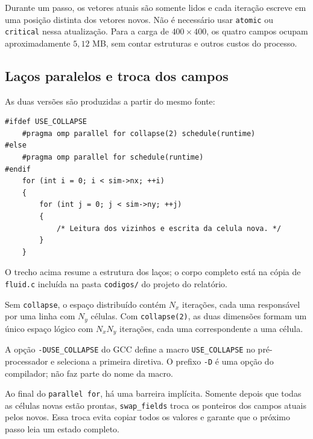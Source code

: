 \documentclass[12pt,a4paper]{article}
\begin{document}
Durante um passo, os vetores atuais são somente lidos e cada iteração escreve em uma posição distinta dos vetores novos. Não é necessário usar \texttt{atomic} ou \texttt{critical} nessa atualização. Para a carga de $400\times400$, os quatro campos ocupam aproximadamente $5{,}12$ MB, sem contar estruturas e outros custos do processo.

\subsection{Laços paralelos e troca dos campos}
As duas versões são produzidas a partir do mesmo fonte:
\begin{lstlisting}[style=CStyle,caption={Seleção da diretiva OpenMP durante a compilação.}]
#ifdef USE_COLLAPSE
    #pragma omp parallel for collapse(2) schedule(runtime)
#else
    #pragma omp parallel for schedule(runtime)
#endif
    for (int i = 0; i < sim->nx; ++i)
    {
        for (int j = 0; j < sim->ny; ++j)
        {
            /* Leitura dos vizinhos e escrita da celula nova. */
        }
    }
\end{lstlisting}
O trecho acima resume a estrutura dos laços; o corpo completo está na cópia de \texttt{fluid.c} incluída na pasta \texttt{codigos/} do projeto do relatório.

Sem \texttt{collapse}, o espaço distribuído contém $N_x$ iterações, cada uma responsável por uma linha com $N_y$ células. Com \texttt{collapse(2)}, as duas dimensões formam um único espaço lógico com $N_xN_y$ iterações, cada uma correspondente a uma célula.

A opção \texttt{-DUSE\_COLLAPSE} do GCC define a macro \texttt{USE\_COLLAPSE} no pré-processador e seleciona a primeira diretiva. O prefixo \texttt{-D} é uma opção do compilador; não faz parte do nome da macro.

Ao final do \texttt{parallel for}, há uma barreira implícita. Somente depois que todas as células novas estão prontas, \texttt{swap\_fields} troca os ponteiros dos campos atuais pelos novos. Essa troca evita copiar todos os valores e garante que o próximo passo leia um estado completo.
\end{document}
